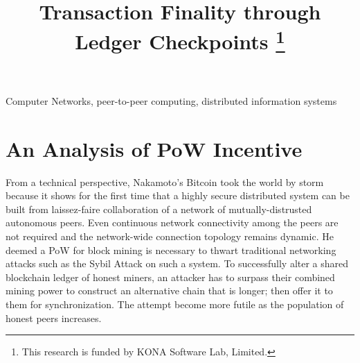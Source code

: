 \documentclass[conference]{IEEEtran}
\begin{document}
\title{Transaction Finality through Ledger Checkpoints 
	\thanks{This research is funded by KONA Software Lab, Limited.}
}

\author{
	\and		
	\and
}
\maketitle

\begin{abstract}
\end{abstract}

\begin{IEEEkeywords}
Computer Networks, peer-to-peer computing, distributed information systems
\end{IEEEkeywords}





\section{An Analysis of PoW Incentive}
\label{s-incentive}
From a technical perspective, Nakamoto's Bitcoin \cite{bitcoin} took the world by storm because it shows for the first time that a highly secure distributed system can be built from laissez-faire collaboration of a network of mutually-distrusted autonomous peers. Even continuous network connectivity among the peers are not required and the network-wide connection topology remains dynamic. He deemed a PoW for block mining is necessary to thwart traditional networking attacks such as the Sybil Attack \cite{Douceur:2002:SA:646334.687813} on such a system. To successfully alter a shared blockchain ledger of honest miners, an attacker has to surpass their combined mining power to construct an alternative chain that is longer; then offer it to them for synchronization. The attempt become more futile as the population of honest peers increases.
\end{document}
